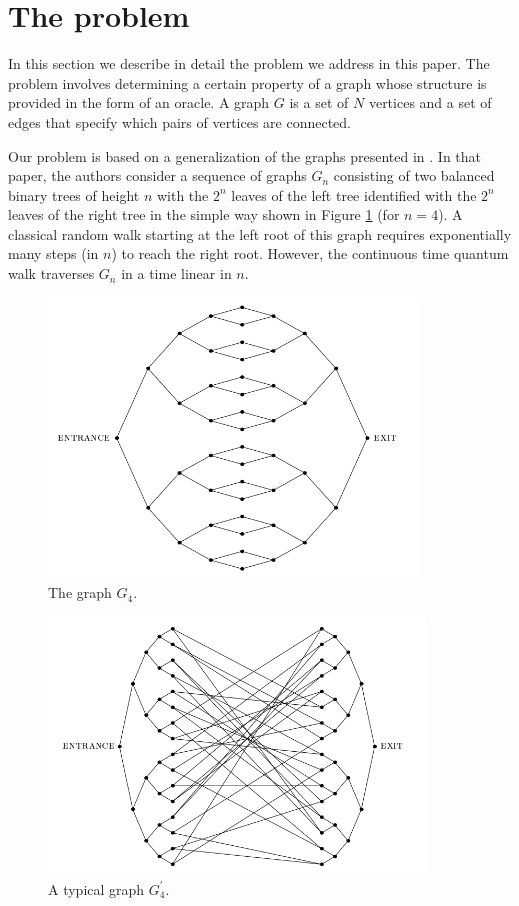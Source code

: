 \documentclass[aps,11pt,twoside,nofootinbib,tightenlines,superscriptaddress,preprintnumbers]{revtex4}
\newcommand{\<}{\langle}
\renewcommand{\>}{\rangle}
\begin{document}
\section{The problem}\label{sec:problem}

In this section we describe in detail the problem we address in this
paper.  The problem involves determining a certain property of a graph
whose structure is provided in the form of an oracle.  A graph $G$ is a
set of $N$ vertices and a set of edges that specify which pairs of
vertices are connected.

Our problem is based on a generalization of the graphs presented in
\cite{CFG02}.  In that paper, the authors consider a sequence of graphs
$G_n$ consisting of two balanced binary trees of height $n$ with the $2^n$
leaves of the left tree identified with the $2^n$ leaves of the right tree
in the simple way shown in Figure \ref{fig:graph} (for $n=4$).  A
classical random walk starting at the left root of this graph requires
exponentially many steps (in $n$) to reach the right root.  However, the
continuous time quantum walk traverses $G_n$ in a time linear in $n$.

\begin{figure}
\includegraphics[width=280pt]{basicgraph4}
\caption{The graph $G_4$.}
\label{fig:graph}
\end{figure}

\begin{figure}
\includegraphics[width=284pt]{graph4}
\caption{A typical graph $G^{\prime}_4$.}
\label{fig:graphprime}
\end{figure}
\end{document}

